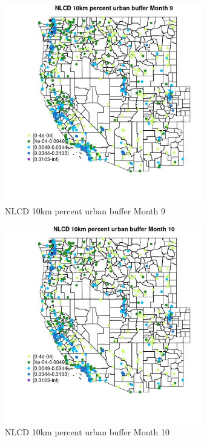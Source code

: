 \begin{figure} 
\centering  
\includegraphics[width=0.77\textwidth]{Code_Outputs/Report_ML_input_PM25_Step4_part_e_de_duplicated_aves_compiled_2019-05-14wNAs_MapObsMo9NLCD_10km_percent_urban_buffer.jpg} 
\caption{\label{fig:Report_ML_input_PM25_Step4_part_e_de_duplicated_aves_compiled_2019-05-14wNAsMapObsMo9NLCD_10km_percent_urban_buffer}NLCD 10km percent urban buffer Month 9} 
\end{figure} 
 

\begin{figure} 
\centering  
\includegraphics[width=0.77\textwidth]{Code_Outputs/Report_ML_input_PM25_Step4_part_e_de_duplicated_aves_compiled_2019-05-14wNAs_MapObsMo10NLCD_10km_percent_urban_buffer.jpg} 
\caption{\label{fig:Report_ML_input_PM25_Step4_part_e_de_duplicated_aves_compiled_2019-05-14wNAsMapObsMo10NLCD_10km_percent_urban_buffer}NLCD 10km percent urban buffer Month 10} 
\end{figure} 
 

